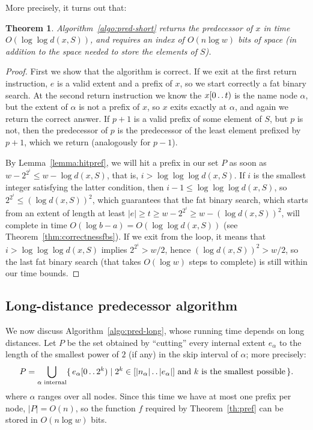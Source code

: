 \documentclass[a4paper,11pt]{article}
\newtheorem{theorem} {Theorem}[section]
\newcommand{\?}{\mskip1.5mu}
\def\..{\,\mathpunct{\ldotp\ldotp}} %
\begin{document}
More precisely, it turns out that:
\begin{theorem}
Algorithm~\ref{algo:pred-short} returns the predecessor of $x$
in time $O(\log\log d(x,S))$, and requires an index of $O(n \log w )$
bits of space (in addition to the space needed to store the elements of $S$).
\end{theorem}
\begin{proof}
First we show that the algorithm is correct. If we exit at the first return
instruction, $e$ is a valid extent and a prefix of $x$, so we start correctly a
fat binary search. At the second return instruction we know the $x[0\..t)$ is
the name node $\alpha$, but the extent of $\alpha$ is not a prefix of $x$, so
$x$ exits exactly at $\alpha$, and again we return the correct answer. If $p+1$ is a valid prefix of some element of $S$, but $p$ is not, then the predecessor
of $p$ is the predecessor of the least element prefixed by $p+1$, which we
return (analogously for $p-1$).

By Lemma~\ref{lemma:hitpref}, we will hit a prefix in our set $P$ as soon as
$w-2^{2^i}\leq w-\log d(x,S)$, that is, $i>\log\log\log d(x,S)$. If $i$ is the
smallest integer satisfying the latter condition, then $i-1\leq \log\log\log
d(x,S)$, so $2^{2^i}\leq (\log d(x,S))^2$, which guarantees that the fat binary
search, which starts from an extent of length at least $|e| \geq t \geq
w-2^{2^i} \geq w-(\log d(x,S))^2$, will complete in time $O(\log
b-a)=O(\log\log d(x,S))$ (see Theorem~\ref{thm:correctnessfbs}). If we exit from the loop,
it means that $i>\log\log\log d(x,S)$ implies $2^{2^i}>w/2$, hence
$(\log d(x,S))^2>w/2$, so the last fat binary search (that takes $O(\log w)$
steps to complete) is still within our time bounds.
\end{proof}

\subsection{Long-distance predecessor algorithm}
\label{sec:long}

We now discuss Algorithm~\ref{algo:pred-long}, whose running time depends on long
distances. Let $P$ be the set obtained by ``cutting''
every internal extent $e_\alpha$ to the length of the smallest power of $2$ (if
any) in the skip interval of $\alpha$; more precisely:
\[
	P=\bigcup_\text{$\alpha$ internal}\{\,e_\alpha[0\..2^k) \mid 2^k \in
	[|n_\alpha|\..|e_\alpha|] \text{ and $k$ is the smallest possible}\,\}.
\]
where $\alpha$ ranges over all nodes. Since this time we
have at most one prefix per node, $|P|=O(n)$, so the function $f$ required by
Theorem~\ref{th:pref} can be stored in $O(n\log w)$ bits. 
\end{document}
